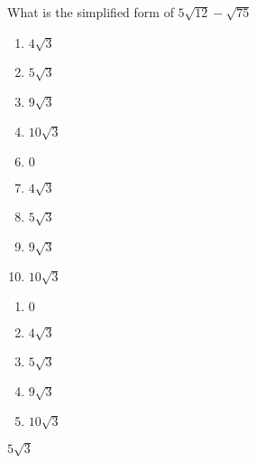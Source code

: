 


  What is the simplified form of $5\sqrt{12}-\sqrt{75}$


\ifsat
	\begin{enumerate}[label=\Alph*)]
		\item  $4\sqrt{3}$ 
		\item $5\sqrt{3}$%
		\item $9\sqrt{3}$ 
		\item  $10\sqrt{3}$ 
	\end{enumerate}
\else
\fi

\ifacteven
	\begin{enumerate}[label=\textbf{\Alph*.},itemsep=\fill,align=left]
		\setcounter{enumii}{5}
		\item    $0$
		\item  $4\sqrt{3}$ 
		\item $5\sqrt{3}$%
		\addtocounter{enumii}{1}
		\item $9\sqrt{3}$ 
		\item  $10\sqrt{3}$ 
	\end{enumerate}
\else
\fi

\ifactodd
	\begin{enumerate}[label=\textbf{\Alph*.},itemsep=\fill,align=left]
		\item    $0$
		\item  $4\sqrt{3}$ 
		\item $5\sqrt{3}$%
		\item $9\sqrt{3}$ 
		\item  $10\sqrt{3}$ 
	\end{enumerate}
\else
\fi

\ifgridin
 $5\sqrt{3}$%
		
\else
\fi

